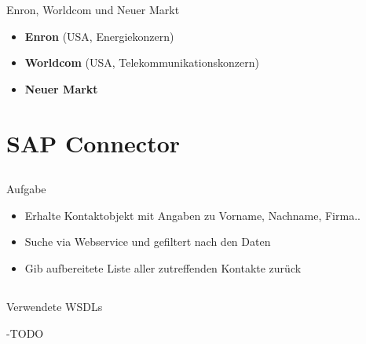 \documentclass[xcolor={usenames,dvipsnames}, compress, 10pt]{beamer}
\begin{document}
\begin{frame}{Enron, Worldcom und Neuer Markt}
\begin{itemize}
	\pause
	\item \textbf{Enron} (USA, Energiekonzern)
	\pause
	\item \textbf{Worldcom} (USA, Telekommunikationskonzern)
	\pause
	\item \textbf{Neuer Markt}
\end{itemize}
\end{frame}


\section{SAP Connector}

\subsection*{}

\begin{frame}{Aufgabe}
\begin{center}

\begin{itemize}
\item Erhalte Kontaktobjekt mit Angaben zu Vorname, Nachname, Firma..
\item Suche via Webservice und gefiltert nach den Daten 
\item Gib aufbereitete Liste aller zutreffenden Kontakte zurück
\end{itemize}

\end{center}
\end{frame}

\subsection*{}

\begin{frame}{Verwendete WSDLs}
\begin{center}


-TODO


\end{center}
\end{frame}

\subsection*{}
\end{document}
